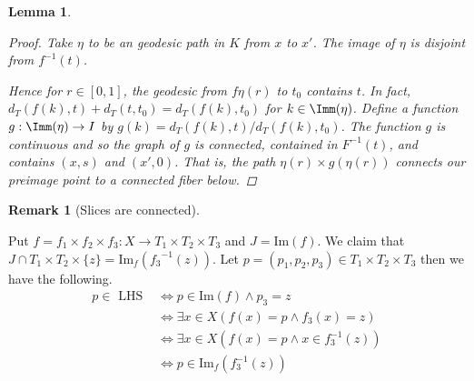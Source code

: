 \documentclass[12pt,parskip=full]{report}
\theoremstyle{plain}
\newtheorem{lem}[thm]{Lemma}
\theoremstyle{definition}
\newtheorem{rmk}[thm]{Remark}
\begin{document}
\begin{lem}
\begin{proof}
        Take $\eta$ to be an geodesic path in $K$ from $x$ to $x'$. The image of $\eta$ is disjoint from $f^{-1}(t)$.
        
        Hence for $r \in [0,1]$, the geodesic from $f\eta(r)$ to $t_0$ contains $t$. In fact, $d_T(f(k), t)+d_T(t, t_0) = d_T(f(k), t_0)$ for $k\in\Imm(\eta)$. Define a function $g:\Imm(\eta)\to I$ by $g(k)=d_T(f(k), t)/d_T(f(k), t_0)$. The function $g$ is continuous and so the graph of $g$ is connected, contained in $F^{-1}(t)$, and contains $(x,s)$ and $(x',0)$. That is, the path $\eta(r)\times g(\eta(r))$ connects our preimage point to a connected fiber below.
    \end{proof}
\end{lem}

\begin{rmk}
    [Slices are connected]
 \label{lem:fibershomeoplanes} 


    Put \(f =  f_{1} \times f_{2} \times f_{3}: X \to T_{1} \times T_{2} \times T_{3} \) and \(J = \text{Im}(f)\). We claim that \(J \cap T_{1} \times T_{2} \times \{z\} = \text{Im}_{f} ({ f_{3}}^{-1}(z))\). Let \(p = (p_{1}, p_{2} , p_{3}) \in T_{1} \times T_{2} \times T_{3}\) then we have the following. 
    \begin{align*}
        p \in \text { LHS } & \Longleftrightarrow p \in \text{Im}(f) \wedge p_{3} = z \\ 
        & \Longleftrightarrow \exists x \in X (f(x)=p \wedge  f_3(x)=z)\\
        & \Longleftrightarrow \exists x \in X (f(x)=p \wedge x \in f_3^{-1} (z))\\
        & \Longleftrightarrow p \in \text{Im}_f(f_3^{-1} (z))
    \end{align*}
\end{rmk}
\end{document}
